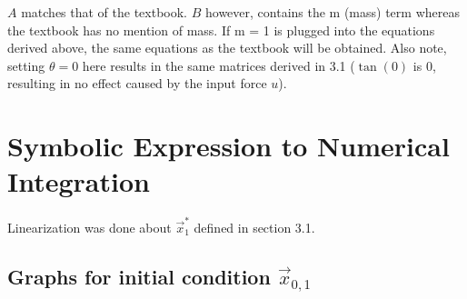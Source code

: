\documentclass[10pt]{article}
\begin{document}
$A$ matches that of the textbook. $B$ however, contains the m (mass) term whereas the textbook has no mention of mass. If m = 1 is plugged into the equations derived above, the same equations as the textbook will be obtained. Also note, setting $\theta = 0$ here results in the same matrices derived in 3.1 ($\tan(0)$ is 0, resulting in no effect caused by the input force $u$).

\section{Symbolic Expression to Numerical Integration}
Linearization was done about $\vec{x}_1^*$ defined in section 3.1.

\subsection{Graphs for initial condition $\vec{x}_{0,1}$}
\end{document}
